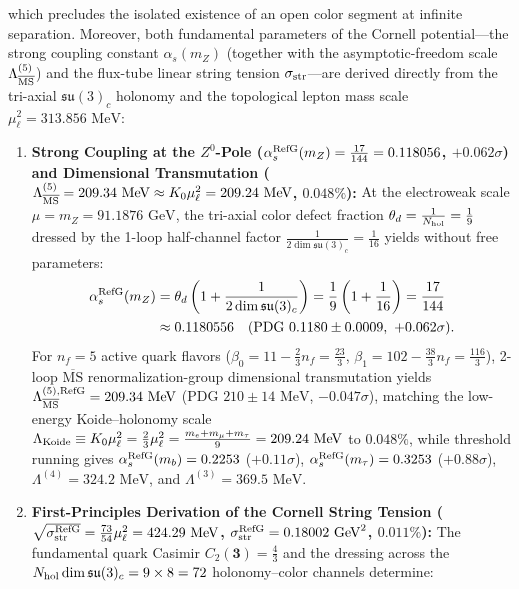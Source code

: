 \documentclass[11pt,a4paper]{article}
\begin{document}
which precludes the isolated existence of an open color segment at infinite separation. Moreover, both fundamental parameters of the Cornell potential---the strong coupling constant $\alpha_s(m_Z)$ (together with the asymptotic-freedom scale $\Lambda_{\overline{\rm MS}}^{(5)}$) and the flux-tube linear string tension $\sigma_{\rm str}$---are derived directly from the tri-axial $\mathfrak{su}(3)_c$ holonomy and the topological lepton mass scale $\mu_\ell^2 = 313.856\text{ MeV}$:
\begin{enumerate}[label=\arabic*.]
\item \textbf{Strong Coupling at the $Z^0$-Pole ($\alpha_s^{\rm RefG}(m_Z) = \frac{17}{144} = 0.118056$, $+0.062\sigma$) and Dimensional Transmutation ($\Lambda_{\overline{\rm MS}}^{(5)} = 209.34\text{ MeV} \approx K_0\mu_\ell^2 = 209.24\text{ MeV}$, $0.048\%$):} At the electroweak scale $\mu = m_Z = 91.1876\text{ GeV}$, the tri-axial color defect fraction $\theta_d = \frac{1}{N_{\rm hol}} = \frac{1}{9}$ dressed by the 1-loop half-channel factor $\frac{1}{2\dim\mathfrak{su}(3)_c} = \frac{1}{16}$ yields without free parameters:
\begin{equation}
\begin{aligned}
\alpha_s^{\rm RefG}(m_Z) &= \theta_d\left(1 + \frac{1}{2\dim\mathfrak{su}(3)_c}\right) = \frac{1}{9}\left(1 + \frac{1}{16}\right) = \frac{17}{144} \\
&\approx 0.1180556 \quad (\text{PDG } 0.1180 \pm 0.0009,\ +0.062\sigma).
\end{aligned}
\end{equation}
For $n_f = 5$ active quark flavors ($\beta_0 = 11 - \frac{2}{3}n_f = \frac{23}{3}$, $\beta_1 = 102 - \frac{38}{3}n_f = \frac{116}{3}$), 2-loop $\overline{\mathrm{MS}}$ renormalization-group dimensional transmutation yields \textbf{$\Lambda_{\overline{\rm MS}}^{(5),\rm RefG} = 209.34\text{ MeV}$} (PDG $210 \pm 14\text{ MeV}$, \textbf{$-0.047\sigma$}), matching the low-energy Koide--holonomy scale $\Lambda_{\rm Koide} \equiv K_0\mu_\ell^2 = \frac{2}{3}\mu_\ell^2 = \frac{m_e+m_\mu+m_\tau}{9} = 209.24\text{ MeV}$ to \textbf{$0.048\%$}, while threshold running gives $\alpha_s^{\rm RefG}(m_b) = 0.2253$ ($+0.11\sigma$), $\alpha_s^{\rm RefG}(m_\tau) = 0.3253$ ($+0.88\sigma$), $\Lambda^{(4)} = 324.2\text{ MeV}$, and $\Lambda^{(3)} = 369.5\text{ MeV}$.
\item \textbf{First-Principles Derivation of the Cornell String Tension ($\sqrt{\sigma_{\rm str}^{\rm RefG}} = \allowbreak \frac{73}{54}\mu_\ell^2 = \allowbreak 424.29\text{ MeV}$, $\sigma_{\rm str}^{\rm RefG} = \allowbreak 0.18002\text{ GeV}^2$, $0.011\%$):} The fundamental quark Casimir $C_2(\mathbf{3}) = \frac{4}{3}$ and the dressing across the $N_{\rm hol}\dim\mathfrak{su}(3)_c = 9\times 8 = 72$ holonomy--color channels determine:

\end{enumerate}
\end{document}
